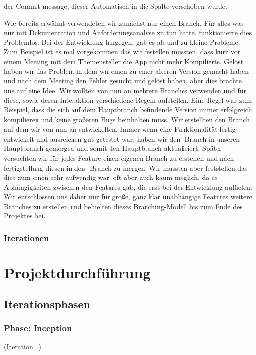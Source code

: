 \documentclass[10pt]{article}
\begin{document}
der Commit-message, dieser Automatisch in die Spalte  verschoben wurde.\par 
\medskip
Wie bereits erwähnt verwendeten wir zunächst nur einen Branch. Für alles was nur mit Dokumentation und Anforderungsanalyse 
zu tun hatte, funktionierte dies Problemlos. Bei der Entwicklung hingegen, gab es ab und zu kleine Probleme.
Zum Beispiel ist es mal vorgekommen das wir festellen mussten, dass kurz vor einem Meeting mit dem Themensteller 
die App nicht mehr Kompilierte. Gelöst haben wir das Problem in dem wir einen  zu einer älteren Version 
gemacht haben und nach dem Meeting den Fehler gesucht und gelöst haben, aber dies brachte uns auf eine Idee.
Wir wollten von nun an mehrere Branches verwenden und für diese, sowie deren Interaktion verschiedene Regeln aufstellen.
Eine Regel war zum Beispiel, dass die sich auf dem Hauptbranch befindende Version immer erfolgreich kompilieren
und keine größeren Bugs beinhalten muss. Wir erstellten den Branch  auf dem wir von nun an entwickelten.
Immer wenn eine Funktionalität fertig entwickelt und ausreichen gut getestet war, haben wir den -Branch in 
unseren Hauptbranch gemerged und somit den Hauptbranch aktualisiert. Später versuchten wir für jedes Feature einen 
eigenen Branch zu erstellen und nach fertigstellung diesen in den -Branch zu mergen. Wir mussten aber feststellen 
das dies zum einen sehr aufwendig war, oft aber auch kaum möglich, da es Abhängigkeiten zwischen den Features gab,
die erst bei der Entwicklung auffielen. Wir entschlossen uns daher nur für große, ganz klar unabhängige Features 
weitere Branches zu erstellen und behielten dieses Branching-Modell bis zum Ende des Projektes bei.

\subsubsection{Iterationen}


\section{Projektdurchführung}
\subsection{Iterationsphasen}
\subsubsection{Phase: Inception}
(Iteration 1)
\end{document}
